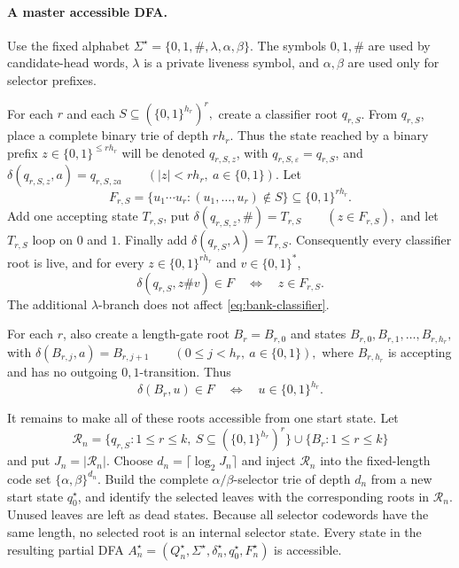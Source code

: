 \documentclass[11pt]{article}
\theoremstyle{definition}
\theoremstyle{remark}
\begin{document}
\paragraph{A master accessible DFA.}
Use the fixed alphabet
\(\Sigma^\star = \{0,1,\#,\lambda,\alpha,\beta\}.\)
The symbols \(0,1,\#\) are used by candidate-head words, \(\lambda\) is a
private liveness symbol, and \(\alpha,\beta\) are used only for selector
prefixes.

For each \(r\) and each
\(S\subseteq(\{0,1\}^{h_r})^r,\)
create a classifier root \(q_{r,S}\).  From \(q_{r,S}\), place a complete
binary trie of depth \(r h_r\).  Thus the state reached by a binary prefix
\(z\in\{0,1\}^{\le r h_r}\) will be denoted \(q_{r,S,z}\), with
\(q_{r,S,\varepsilon}=q_{r,S}\), and
\(\delta(q_{r,S,z},a)=q_{r,S,za} \qquad (|z|<rh_r,\ a\in\{0,1\}).\)
Let
\[
F_{r,S}
=
\{u_1\cdots u_r:
(u_1,\ldots,u_r)\notin S\}
\subseteq\{0,1\}^{rh_r}.
\]
Add one accepting state \(T_{r,S}\), put
\(\delta(q_{r,S,z},\#)=T_{r,S} \qquad (z\in F_{r,S}),\)
and let \(T_{r,S}\) loop on \(0\) and \(1\).  Finally add
\(\delta(q_{r,S},\lambda)=T_{r,S}.\)
Consequently every classifier root is live, and for every
\(z\in\{0,1\}^{rh_r}\) and \(v\in\{0,1\}^\ast\),
\begin{equation}
\label{eq:bank-classifier}
\delta(q_{r,S},z\#v)\in F
\quad\Longleftrightarrow\quad
z\in F_{r,S}.
\end{equation}
The additional \(\lambda\)-branch does not affect
\eqref{eq:bank-classifier}.

For each \(r\), also create a length-gate root \(B_r=B_{r,0}\) and states
\(B_{r,0},B_{r,1},\ldots,B_{r,h_r},\)
with
\(\delta(B_{r,j},a)=B_{r,j+1} \qquad (0\le j<h_r,\ a\in\{0,1\}),\)
where \(B_{r,h_r}\) is accepting and has no outgoing \(0,1\)-transition.
Thus
\begin{equation}
\label{eq:bank-gate}
\delta(B_r,u)\in F
\quad\Longleftrightarrow\quad
u\in\{0,1\}^{h_r}.
\end{equation}

It remains to make all of these roots accessible from one start state.
Let
\[
\mathcal R_n
=
\{q_{r,S}:1\le r\le k,\ S\subseteq(\{0,1\}^{h_r})^r\}
\cup
\{B_r:1\le r\le k\}
\]
and put \(J_n=|\mathcal R_n|\).
Choose
\(d_n=\lceil\log_2 J_n\rceil\)
and inject \(\mathcal R_n\) into the fixed-length code set
\(\{\alpha,\beta\}^{d_n}\).
Build the complete \(\alpha/\beta\)-selector trie of depth \(d_n\) from a
new start state \(q_0^\star\), and identify the selected leaves with the
corresponding roots in \(\mathcal R_n\).  Unused leaves are left as dead
states.  Because all selector codewords have the same length, no selected
root is an internal selector state.  Every state in the resulting partial
DFA
\(A_n^\star=(Q_n^\star,\Sigma^\star,\delta_n^\star,q_0^\star,F_n^\star)\)
is accessible.
\end{document}
